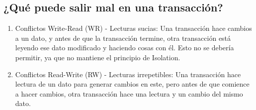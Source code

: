 \subsection{¿Qué puede salir mal en una transacción?}
\begin{enumerate}
  \item Conflictos Write-Read (WR) - Lecturas sucias: Una transacción hace cambios a un dato, y antes de que la transacción termine, otra transacción está leyendo ese dato modificado y haciendo cosas con él. Esto no se debería permitir, ya que no mantiene el principio de Isolation.
  \item Conflictos Read-Write (RW) - Lecturas irrepetibles: Una transacción hace lectura de un dato para generar cambios en este, pero antes de que comience a hacer cambios, otra transacción hace una lectura y un cambio del mismo dato.
\end{enumerate}
